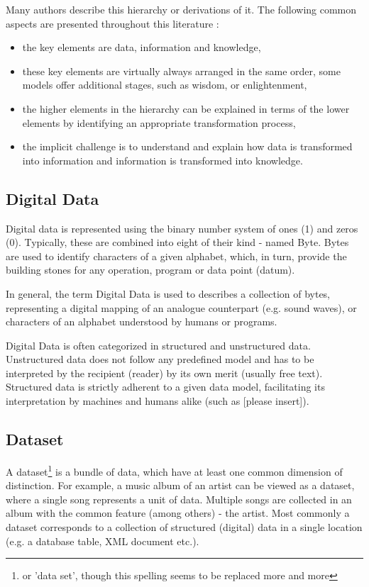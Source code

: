 \documentclass[a4paper,english,twoside,BCOR1.5cm,headsepline,DIV12,appendixprefix,final,12pt]{scrbook}
\begin{document}
Many authors describe this hierarchy or derivations of it. The following common aspects are presented throughout this literature \cite{Rowley2007}: 

\begin{itemize}
\item the key elements are data, information and knowledge,
\item these key elements are virtually always arranged in the same order, some models offer additional stages, such as wisdom, or enlightenment,
\item the higher elements in the hierarchy can be explained in terms of the lower elements by identifying an appropriate transformation process,
\item the implicit challenge is to understand and explain how data is transformed into information and information is transformed into knowledge.
\end{itemize}

\subsection{Digital Data}
\label{sec:digital}
Digital data is represented using the binary number system of ones (1) and zeros (0). Typically, these are combined into eight of their kind - named Byte. Bytes are used to identify characters of a given alphabet, which, in turn, provide the building stones for any operation, program or data point (datum).

In general, the term Digital Data is used to describes a collection of bytes, representing a digital mapping of an analogue counterpart (e.g. sound waves), or characters of an alphabet understood by humans or programs.

Digital Data is often categorized in structured and unstructured data. Unstructured data does not follow any predefined model and has to be interpreted by the recipient (reader) by its own merit (usually free text). Structured data is strictly adherent to a given data model, facilitating its interpretation by machines and humans alike (such as [please insert]). 

\subsection{Dataset}
\label{sec:dataset}

A dataset\footnote{or 'data set', though this spelling seems to be replaced more and more} is a bundle of data, which have at least one common dimension of distinction. For example, a music album of an artist can be viewed as a dataset, where a single song represents a unit of data. Multiple songs are collected in an album with the common feature (among others) - the artist. Most commonly a dataset corresponds to a collection of structured (digital) data in a single location (e.g. a database table, XML document etc.).
\end{document}

